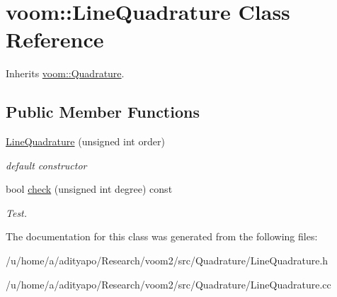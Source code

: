 \hypertarget{classvoom_1_1_line_quadrature}{
\section{voom::LineQuadrature Class Reference}
\label{classvoom_1_1_line_quadrature}
}


Inherits \hyperlink{classvoom_1_1_quadrature}{voom::Quadrature}.\subsection*{Public Member Functions}
\begin{DoxyCompactItemize}
\item 
\hypertarget{classvoom_1_1_line_quadrature_a77e21fa2dd459590a3f2af6126ba6cd0}{
\hyperlink{classvoom_1_1_line_quadrature_a77e21fa2dd459590a3f2af6126ba6cd0}{LineQuadrature} (unsigned int order)}
\label{classvoom_1_1_line_quadrature_a77e21fa2dd459590a3f2af6126ba6cd0}

\begin{DoxyCompactList}\small\item\em default constructor \item\end{DoxyCompactList}\item 
\hypertarget{classvoom_1_1_line_quadrature_a6a9d656053fb790567d825e542060424}{
bool \hyperlink{classvoom_1_1_line_quadrature_a6a9d656053fb790567d825e542060424}{check} (unsigned int degree) const }
\label{classvoom_1_1_line_quadrature_a6a9d656053fb790567d825e542060424}

\begin{DoxyCompactList}\small\item\em Test. \item\end{DoxyCompactList}\end{DoxyCompactItemize}


The documentation for this class was generated from the following files:\begin{DoxyCompactItemize}
\item 
/u/home/a/adityapo/Research/voom2/src/Quadrature/LineQuadrature.h\item 
/u/home/a/adityapo/Research/voom2/src/Quadrature/LineQuadrature.cc\end{DoxyCompactItemize}
